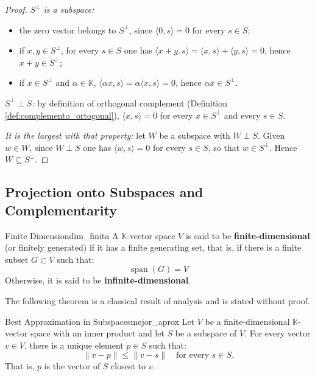 \documentclass[11pt, a4paper]{article}
\begin{document}
\begin{proof}
\textit{$S^\perp$ is a subspace:}
\begin{itemize}
    \item the zero vector belongs to $S^\perp$, since $\langle 0, s \rangle = 0$ for every $s \in S$;
    \item if $x, y \in S^\perp$, for every $s \in S$ one has $\langle x+y, s \rangle = \langle x, s \rangle + \langle y, s \rangle = 0$, hence $x+y \in S^\perp$;
    \item if $x \in S^\perp$ and $\alpha \in \mathbb{K}$, $\langle \alpha x, s \rangle = \alpha \langle x, s \rangle = 0$, hence $\alpha x \in S^\perp$.
\end{itemize}

\textit{$S^\perp \perp S$:} by definition of orthogonal complement (Definition \ref{def:complemento_ortogonal}), $\langle x, s \rangle = 0$ for every $x \in S^\perp$ and every $s \in S$.

\textit{It is the largest with that property:} let $W$ be a subspace with $W \perp S$. Given $w \in W$, since $W \perp S$ one has $\langle w, s \rangle = 0$ for every $s \in S$, so that $w \in S^\perp$. Hence $W \subseteq S^\perp$.
\end{proof}

\subsection{Projection onto Subspaces and Complementarity}

\begin{definicion}{Finite Dimension}{dim_finita}
A $\mathbb{K}$-vector space $V$ is said to be \textbf{finite-dimensional} (or finitely generated) if it has a finite generating set, that is, if there is a finite subset $G \subset V$ such that:
\[ \operatorname{span}(G) = V \]
Otherwise, it is said to be \textbf{infinite-dimensional}.
\end{definicion}

The following theorem is a classical result of analysis and is stated without proof.

\begin{teorema}{Best Approximation in Subspaces}{mejor_aprox}
Let $V$ be a finite-dimensional $\mathbb{K}$-vector space with an inner product and let $S$ be a subspace of $V$.
For every vector $v \in V$, there is a unique element $p \in S$ such that:
\[ \|v - p\| \leq \|v - s\| \quad \text{for every } s \in S. \]
That is, $p$ is the vector of $S$ closest to $v$.
\end{teorema}
\end{document}
